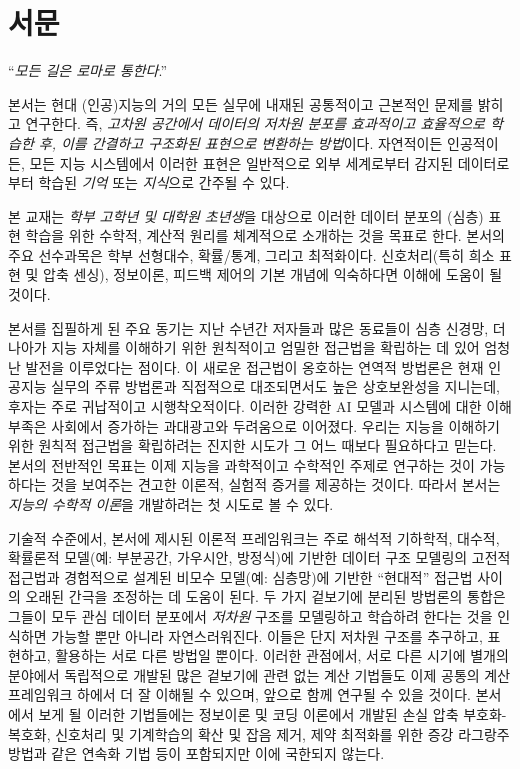 \documentclass[../../book-main_ko.tex]{subfiles}
\begin{document}
\chapter*{서문}

\begin{center}
``{\em 모든 길은 로마로 통한다}.''

\end{center}
\vspace{5mm}

본서는 현대 (인공)지능의 거의 모든 실무에 내재된 공통적이고 근본적인 문제를 밝히고 연구한다. 즉, {\em 고차원 공간에서 데이터의 저차원 분포를 효과적이고 효율적으로 학습한 후, 이를 간결하고 구조화된 표현으로 변환하는 방법}이다. 자연적이든 인공적이든, 모든 지능 시스템에서 이러한 표현은 일반적으로 외부 세계로부터 감지된 데이터로부터 학습된 {\em 기억} 또는 {\em 지식}으로 간주될 수 있다.

본 교재는 {\em 학부 고학년 및 대학원 초년생}을 대상으로 이러한 데이터 분포의 (심층) 표현 학습을 위한 수학적, 계산적 원리를 체계적으로 소개하는 것을 목표로 한다. 본서의 주요 선수과목은 학부 선형대수, 확률/통계, 그리고 최적화이다. 신호처리(특히 희소 표현 및 압축 센싱), 정보이론, 피드백 제어의 기본 개념에 익숙하다면 이해에 도움이 될 것이다.

본서를 집필하게 된 주요 동기는 지난 수년간 저자들과 많은 동료들이 심층 신경망, 더 나아가 지능 자체를 이해하기 위한 원칙적이고 엄밀한 접근법을 확립하는 데 있어 엄청난 발전을 이루었다는 점이다. 이 새로운 접근법이 옹호하는 연역적 방법론은 현재 인공지능 실무의 주류 방법론과 직접적으로 대조되면서도 높은 상호보완성을 지니는데, 후자는 주로 귀납적이고 시행착오적이다. 이러한 강력한 AI 모델과 시스템에 대한 이해 부족은 사회에서 증가하는 과대광고와 두려움으로 이어졌다. 우리는 지능을 이해하기 위한 원칙적 접근법을 확립하려는 진지한 시도가 그 어느 때보다 필요하다고 믿는다. 본서의 전반적인 목표는 이제 지능을 과학적이고 수학적인 주제로 연구하는 것이 가능하다는 것을 보여주는 견고한 이론적, 실험적 증거를 제공하는 것이다. 따라서 본서는 {\em 지능의 수학적 이론}을 개발하려는 첫 시도로 볼 수 있다.

기술적 수준에서, 본서에 제시된 이론적 프레임워크는 주로 해석적 기하학적, 대수적, 확률론적 모델(예: 부분공간, 가우시안, 방정식)에 기반한 데이터 구조 모델링의 고전적 접근법과 경험적으로 설계된 비모수 모델(예: 심층망)에 기반한 ``현대적'' 접근법 사이의 오래된 간극을 조정하는 데 도움이 된다. 두 가지 겉보기에 분리된 방법론의 통합은 그들이 모두 관심 데이터 분포에서 {\em 저차원} 구조를 모델링하고 학습하려 한다는 것을 인식하면 가능할 뿐만 아니라 자연스러워진다. 이들은 단지 저차원 구조를 추구하고, 표현하고, 활용하는 서로 다른 방법일 뿐이다. 이러한 관점에서, 서로 다른 시기에 별개의 분야에서 독립적으로 개발된 많은 겉보기에 관련 없는 계산 기법들도 이제 공통의 계산 프레임워크 하에서 더 잘 이해될 수 있으며, 앞으로 함께 연구될 수 있을 것이다. 본서에서 보게 될 이러한 기법들에는 정보이론 및 코딩 이론에서 개발된 손실 압축 부호화-복호화, 신호처리 및 기계학습의 확산 및 잡음 제거, 제약 최적화를 위한 증강 라그랑주 방법과 같은 연속화 기법 등이 포함되지만 이에 국한되지 않는다.
\end{document}

